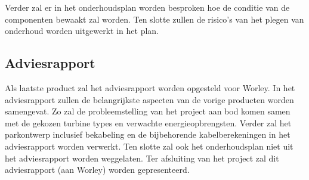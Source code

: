 Verder zal er in het onderhoudsplan worden besproken hoe de conditie van de componenten bewaakt zal worden. Ten slotte zullen de risico's van het plegen van onderhoud worden uitgewerkt in het plan. 

\subsection{Adviesrapport}
Als laatste product zal het adviesrapport worden opgesteld voor Worley. In het adviesrapport zullen de belangrijkste aspecten van de vorige producten worden samengevat. Zo zal de probleemstelling van het project aan bod komen samen met de gekozen turbine types en verwachte energieopbrengsten. Verder zal het parkontwerp inclusief bekabeling en de bijbehorende kabelberekeningen in het adviesrapport worden verwerkt. Ten slotte zal ook het onderhoudsplan niet uit het adviesrapport worden weggelaten. Ter afsluiting van het project zal dit adviesrapport (aan Worley) worden gepresenteerd. 

